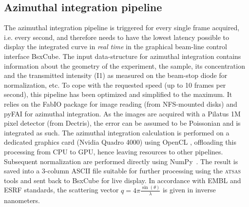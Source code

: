 \documentclass[preprint,pdf]{iucr}              %
\begin{document}
\subsection{Azimuthal integration pipeline}
\label{AI}
The azimuthal integration pipeline is triggered for every single frame acquired, i.e. every second,
and therefore needs to have the lowest latency possible to display the integrated curve
in \textit{real time} in the graphical beam-line control interface BsxCube.
The input data-structure for azimuthal integration contains
information about the geometry of the experiment, the sample, its concentration
and the transmitted intensity (I1) as measured on the beam-stop diode for
normalization, etc.
To cope with the requested speed (up to 10 frames per second), this pipeline
has been optimized and simplified to the maximum.
It relies on the FabIO \cite{fabio} package for image reading (from NFS-mounted
disks) and pyFAI \cite{pyFAI} for azimuthal integration.
As the images are acquired with a Pilatus 1M pixel detector (from Dectris), the
error can be assumed to be Poissonian and is integrated as such.
The azimuthal integration calculation is performed on a dedicated graphics card
(Nvidia Quadro 4000) using OpenCL \cite{pyFAI_gpu}, offloading this processing
from CPU to GPU, hence leaving resources to other pipelines.
Subsequent normalization are performed directly using NumPy~\cite{numpy}.
The result is saved into a 3-column ASCII file suitable for further processing
using the \textsc{atsas} tools \cite{ATSAS2} and sent back to BsxCube for
live display.
In accordance with EMBL and ESRF standards, the scattering vector
$q=4\pi\frac{\sin(\theta)}{\lambda}$ is given in inverse nanometers.
\end{document}
